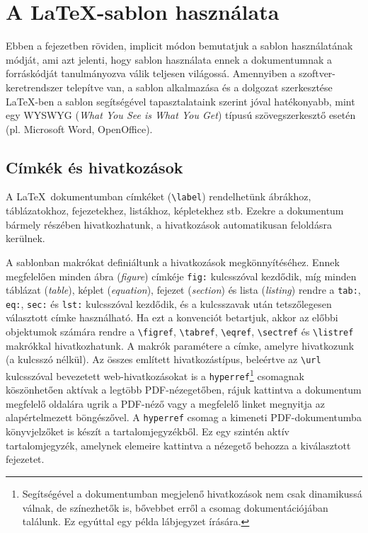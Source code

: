 \chapter{A \LaTeX-sablon használata}

Ebben a fejezetben röviden, implicit módon bemutatjuk a sablon használatának módját, ami azt jelenti, hogy sablon használata ennek a dokumentumnak a forráskódját tanulmányozva válik teljesen világossá. Amennyiben a szoftver-keretrendszer telepítve van, a sablon alkalmazása és a dolgozat szerkesztése \LaTeX-ben a sablon segítségével tapasztalataink szerint jóval hatékonyabb, mint egy WYSWYG (\emph{What You See is What You Get}) típusú szövegszerkesztő esetén (pl. Microsoft Word, OpenOffice).

\section{Címkék és hivatkozások}
A \LaTeX~dokumentumban címkéket (\verb+\label+) rendelhetünk ábrákhoz, táblázatokhoz, fejezetekhez, listákhoz, képletekhez stb. Ezekre a dokumentum bármely részében hivatkozhatunk, a hivatkozások automatikusan feloldásra kerülnek.

A sablonban makrókat definiáltunk a hivatkozások megkönnyítéséhez. Ennek megfelelően minden ábra (\emph{figure}) címkéje \verb+fig:+ kulcsszóval kezdődik, míg minden táblázat (\emph{table}), képlet (\emph{equation}), fejezet (\emph{section}) és lista (\emph{listing}) rendre a \verb+tab:+, \verb+eq:+, \verb+sec:+ és \verb+lst:+ kulcsszóval kezdődik, és a kulcsszavak után tetszőlegesen választott címke használható. Ha ezt a konvenciót betartjuk, akkor az előbbi objektumok számára rendre a \verb+\figref+, \verb+\tabref+, \verb+\eqref+, \verb+\sectref+ és \verb+\listref+ makrókkal hivatkozhatunk. A makrók paramétere a címke, amelyre hivatkozunk (a kulcsszó nélkül). Az összes említett hivatkozástípus, beleértve az \verb+\url+ kulcsszóval bevezetett web-hivatkozásokat is a  \verb+hyperref+\footnote{Segítségével a dokumentumban megjelenő hivatkozások nem csak dinamikussá válnak, de színezhetők is, bővebbet erről a csomag dokumentációjában találunk. Ez egyúttal egy példa lábjegyzet írására.} csomagnak köszönhetően aktívak a legtöbb PDF-nézegetőben, rájuk kattintva a dokumentum megfelelő oldalára ugrik a PDF-néző vagy a megfelelő linket megnyitja az alapértelmezett böngészővel. A \verb+hyperref+ csomag a kimeneti PDF-dokumentumba könyvjelzőket is készít a tartalomjegyzékből. Ez egy szintén aktív tartalomjegyzék, amelynek elemeire kattintva a nézegető behozza a kiválasztott fejezetet.

